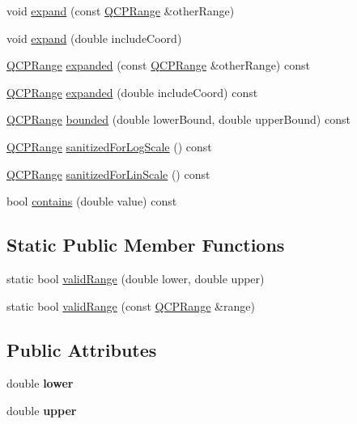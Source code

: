 \begin{DoxyCompactItemize}
\item 
void \hyperlink{classQCPRange_a0fa1bc8048be50d52bea93a8caf08305}{expand} (const \hyperlink{classQCPRange}{Q\+C\+P\+Range} \&other\+Range)
\item 
void \hyperlink{classQCPRange_a5fa977db0a4b7800075c629c62cf5e80}{expand} (double include\+Coord)
\item 
\hyperlink{classQCPRange}{Q\+C\+P\+Range} \hyperlink{classQCPRange_a9cbfb7cd06eac1839cae981e05c19633}{expanded} (const \hyperlink{classQCPRange}{Q\+C\+P\+Range} \&other\+Range) const
\item 
\hyperlink{classQCPRange}{Q\+C\+P\+Range} \hyperlink{classQCPRange_af81d70f1add7233d73a19dcbe5decb2e}{expanded} (double include\+Coord) const
\item 
\hyperlink{classQCPRange}{Q\+C\+P\+Range} \hyperlink{classQCPRange_a22151e18d961d762d25721211e89c2e5}{bounded} (double lower\+Bound, double upper\+Bound) const
\item 
\hyperlink{classQCPRange}{Q\+C\+P\+Range} \hyperlink{classQCPRange_a3d66288d66e1d6df3636075eb42502ee}{sanitized\+For\+Log\+Scale} () const
\item 
\hyperlink{classQCPRange}{Q\+C\+P\+Range} \hyperlink{classQCPRange_a808751fdd9b17ef52327ba011df2e5f1}{sanitized\+For\+Lin\+Scale} () const
\item 
bool \hyperlink{classQCPRange_ae9842b48b6d38dc5e9607358e3083cc8}{contains} (double value) const
\end{DoxyCompactItemize}
\subsection*{Static Public Member Functions}
\begin{DoxyCompactItemize}
\item 
static bool \hyperlink{classQCPRange_ab38bd4841c77c7bb86c9eea0f142dcc0}{valid\+Range} (double lower, double upper)
\item 
static bool \hyperlink{classQCPRange_a801b964752eaad6219be9d8a651ec2b3}{valid\+Range} (const \hyperlink{classQCPRange}{Q\+C\+P\+Range} \&range)
\end{DoxyCompactItemize}
\subsection*{Public Attributes}
\begin{DoxyCompactItemize}
\item 
\mbox{\label{classQCPRange_aa3aca3edb14f7ca0c85d912647b91745}} 
double {\bfseries lower}
\item 
\mbox{\label{classQCPRange_ae44eb3aafe1d0e2ed34b499b6d2e074f}} 
double {\bfseries upper}
\end{DoxyCompactItemize}
